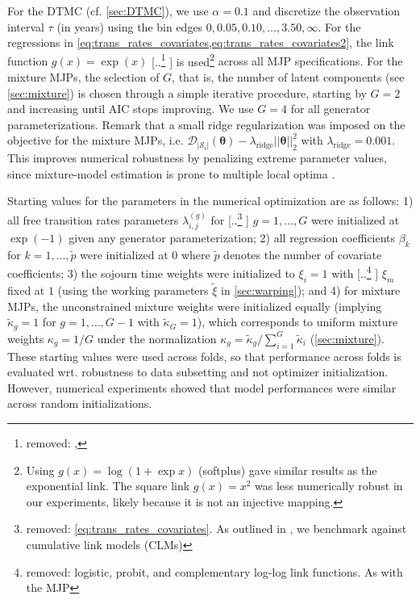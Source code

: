 \documentclass{article}
\providecommand{\DIFadd}[1]{{\protect\color{blue} \sf #1}} %
\providecommand{\DIFdel}[1]{{\protect\color{red} [..\footnote{removed: #1} ]}} %
\providecommand{\DIFaddbegin}{} %
\providecommand{\DIFaddend}{} %
\providecommand{\DIFdelbegin}{} %
\providecommand{\DIFdelend}{} %
\begin{document}
\DIFadd{For the DTMC (cf. \cref{sec:DTMC}), we use $\alpha=0.1$ and discretize the observation interval $\tau$ (in years) using the bin edges
$
0,0.05,0.10,\dots,3.50,\infty
$.
For the regressions in \cref{eq:trans_rates_covariates,eq:trans_rates_covariates2}, the link function }\DIFaddend $g(x) = \exp(x)$ \DIFdelbegin \DIFdel{, }\DIFdelend \DIFaddbegin \DIFadd{is used}\footnote{\DIFadd{Using $g(x)=\log(1+\exp x)$ (softplus) gave similar results as the exponential link. The square link $g(x)=x^2$ was less numerically robust in our experiments, likely because it is not an injective mapping.}} \DIFadd{across all MJP specifications.
For the mixture MJPs, the selection of $G$, that is, the number of latent components (see \cref{sec:mixture}) is chosen through a simple iterative procedure, starting by $G=2$ and increasing until AIC stops improving. We use $G = 4$ for all generator parameterizations. Remark that a small ridge regularization was imposed on the objective for the mixture MJPs, i.e. $\mathcal D_{|\mathcal S_i|} (\bm \theta) - \lambda_{\text{ridge}} ||\bm \theta||_{2}^2$ with $\lambda_{\text{ridge}} = 0.001$.  This improves numerical robustness by penalizing extreme parameter values, since mixture-model estimation is prone to multiple local optima \citep{shireman2016a}.
}

\DIFadd{Starting values for the parameters in the numerical optimization are as follows: 1) all free transition rates parameters $\lambda_{i,j}^{(g)}$ }\DIFaddend for \DIFdelbegin \DIFdel{\cref{eq:trans_rates_covariates}. As outlined in \Cref{sec:cumulative_link_model}, we benchmark against cumulative link models (CLMs)}\DIFdelend \DIFaddbegin \DIFadd{$g = 1,\dots,G$ were initialized at $\exp(-1)$ given any generator parameterization; 2) all regression coefficients $ \beta_k$ for $ k = 1,\dots, \widetilde{p}$ were initialized at $0$ where $\widetilde{p}$ denotes the number of covariate coefficients; 3) the sojourn time weights were initialized to $\xi_i=1$ }\DIFaddend with \DIFdelbegin \DIFdel{logistic, probit, and complementary log-log link functions. As with the MJP}\DIFdelend \DIFaddbegin \DIFadd{$\xi_m$ fixed at $1$ (using the working parameters $\widetilde \xi$ in \cref{sec:warping}); and 4) for mixture MJPs, the unconstrained mixture weights were initialized equally (implying $\tilde\kappa_g = 1$ for $g=1,\dots,G-1$ with $\tilde\kappa_G=1$), which corresponds to uniform mixture weights $\kappa_g = 1/G$ under the normalization $\kappa_g=\tilde\kappa_g/\sum_{i=1}^G \tilde\kappa_i $ (\cref{sec:mixture}).  
These starting values were used across folds, so that performance across folds is evaluated wrt. robustness to data subsetting and not optimizer initialization. However, numerical experiments showed that model performances were similar across random initializations.
}
\end{document}
